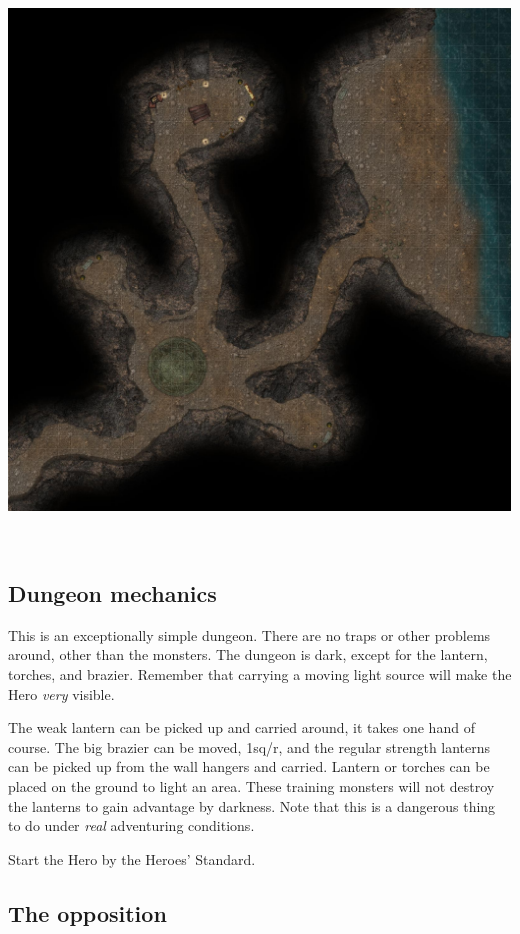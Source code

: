 \clearpage %

\noindent
\includegraphics[width=0.999\textwidth]{./map/cave.jpg}

\


\subsection*{Dungeon mechanics}

This is an exceptionally simple dungeon. There are no traps or other problems around, other than the monsters. The dungeon is dark, except for the lantern, torches, and brazier. Remember that carrying a moving light source will make the Hero \emph{very} visible.

The weak lantern can be picked up and carried around, it takes one hand of course. The big brazier can be moved, 1sq/r, and the regular strength lanterns can be picked up from the wall hangers and carried. Lantern or torches can be placed on the ground to light an area. These training monsters will not destroy the lanterns to gain advantage by darkness. Note that this is a dangerous thing to do under \emph{real} adventuring conditions.

Start the Hero by the Heroes' Standard. 


\subsection*{The opposition}

